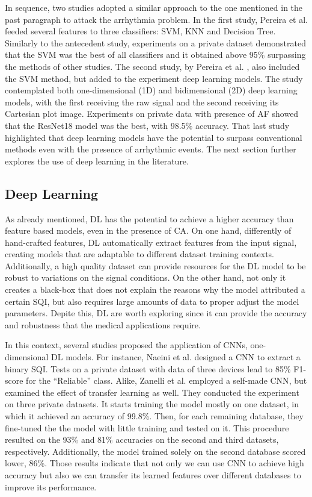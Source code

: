 In sequence, two studies adopted a similar approach to the one mentioned in the past paragraph to attack the arrhythmia problem. In the first study, Pereira et al. \cite{arrhythmia-3} feeded several features to three classifiers: \gls{SVM}, \gls{KNN} and Decision Tree. Similarly to the antecedent study, experiments on a private dataset demonstrated that the \gls{SVM} was the best of all classifiers and it obtained above 95\% surpassing the methods of other studies. The second study, by Pereira et al. \cite{arrhythmia-4}, also included the \gls{SVM} method, but added to the experiment deep learning models. The study contemplated both one-dimensional (1D) and bidimensional (2D) deep learning models, with the first receiving the raw signal and the second receiving its Cartesian plot image. Experiments on private data with presence of \gls{AF} showed that the ResNet18 model was the best, with 98.5\% accuracy. That last study highlighted that deep learning models have the potential to surpass conventional methods even with the presence of arrhythmic events. The next section further explores the use of deep learning in the literature.  

\subsection{Deep Learning}
\label{sec:deep_learning}

As already mentioned, \gls{DL} has the potential to achieve a higher accuracy than feature based models, even in the presence of \gls{CA}. On one hand, differently of hand-crafted features, \gls{DL} automatically extract features from the input signal, creating models that are adaptable to different dataset training contexts. Additionally, a high quality dataset can provide resources for the \gls{DL} model to be robust to variations on the signal conditions. On the other hand, not only it creates a black-box that does not explain the reasons why the model attributed a certain \gls{SQI}, but also requires large amounts of data to proper adjust the model parameters. Depite this, \gls{DL} are worth exploring since it can provide the accuracy and robustness that the medical applications require. 

In this context, several studies proposed the application of \gls{CNN}s, one-dimensional \gls{DL} models. For instance, Naeini et al. \cite{deep-learning-1} designed a \gls{CNN} to extract a binary \gls{SQI}. Tests on a private dataset with data of three devices lead to 85\% F1-score for the ``Reliable'' class. Alike, Zanelli et al. \cite{deep-learning-2} employed a self-made \gls{CNN}, but examined the effect of transfer learning as well. They conducted the experiment on three private datasets. It starts training the model mostly on one dataset, in which it achieved an accuracy of 99.8\%. Then, for each remaining database, they fine-tuned the the model with little training and tested on it. This procedure resulted on the 93\% and 81\% accuracies on the second and third datasets, respectively. Additionally, the model trained solely on the second database scored lower, 86\%. Those results indicate that not only we can use \gls{CNN} to achieve high accuracy but also we can transfer its learned features over different databases to improve its performance.

